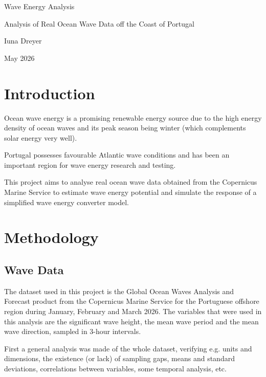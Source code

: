 \documentclass[11pt,a4paper]{article}
\begin{document}
\begin{center}
    \vspace{2cm}

    \Huge{Wave Energy Analysis}\vspace{0.5cm}

    \large{Analysis of Real Ocean Wave Data off the Coast of Portugal}\vspace{1cm}

    Iuna Dreyer\vspace{0.3cm}

    May 2026\vspace{1cm}
\end{center}



\section{Introduction}

Ocean wave energy is a promising renewable energy source due to the high energy density of ocean waves and its peak season being winter (which complements solar energy very well).

Portugal possesses favourable Atlantic wave conditions and has been an important region for wave energy research and testing.

This project aims to analyse real ocean wave data obtained from the Copernicus Marine Service to estimate wave energy potential and simulate the response of a simplified wave energy converter model.




\section{Methodology}

\subsection{Wave Data}

The dataset used in this project is the Global Ocean Waves Analysis and Forecast product from the Copernicus Marine Service for the Portuguese offshore region during January, February and March 2026. The variables that were used in this analysis are the significant wave height, the mean wave period and the mean wave direction, sampled in 3-hour intervals.

First a general analysis was made of the whole dataset, verifying e.g. units and dimensions, the existence (or lack) of sampling gaps, means and standard deviations, correlations between variables, some temporal analysis, etc.
\end{document}
